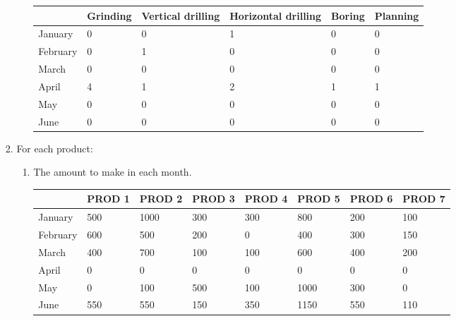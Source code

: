 \documentclass[12pt,a4paper]{article}
\theoremstyle{definition}
\begin{document}
\begin{enumerate}
\begin{enumerate}
\begin{enumerate}
\begin{enumerate}
    \begin{table}[H]
      \scriptsize
      \centering
      \renewcommand\arraystretch{1.1}
      \begin{tabular}{m{} m{}<{\centering} m{}<{\centering} m{}<{\centering} m{}<{\centering} m{}<{\centering} }
      \hline
       & \textbf{Grinding} & \textbf{Vertical drilling} & \textbf{Horizontal drilling} & \textbf{Boring} & \textbf{Planning} \\\hline
      January   & 0 & 0 & 1 & 0 & 0  \\
      February  & 0 & 1 & 0 & 0 & 0  \\
      March     & 0 & 0 & 0 & 0 & 0 \\
      April     & 4 & 1 & 2 & 1 & 1  \\
      May       & 0 & 0 & 0 & 0 & 0\\
      June      & 0 & 0 & 0 & 0 & 0 \\
      \hline
      \end{tabular}
    \end{table}
    \end{enumerate}
    \item
    For each product:
    \begin{enumerate}
    \item
    The amount to make in each month.
    \begin{table}[H]
      \scriptsize
      \centering
      \renewcommand\arraystretch{1.1}
      \begin{tabular}{m{} m{}<{\centering} m{}<{\centering} m{}<{\centering} m{}<{\centering} m{}<{\centering} m{}<{\centering} m{}<{\centering}}
      \hline
       & \textbf{PROD 1} & \textbf{PROD 2} & \textbf{PROD 3} & \textbf{PROD 4} & \textbf{PROD 5} & \textbf{PROD 6} &  \textbf{PROD 7} \\\hline
      January   & 500 & 1000 & 300 & 300 & 800 & 200 & 100 \\
      February  & 600 & 500 & 200   & 0 & 400 & 300 & 150 \\
      March     & 400 & 700 & 100 & 100 & 600 & 400 & 200 \\
      April     & 0   & 0   & 0   & 0   & 0   & 0   & 0 \\
      May       & 0   & 100 & 500 & 100 & 1000 & 300 & 0 \\
      June      & 550 & 550 & 150 & 350 & 1150 & 550 & 110 \\

\end{tabular}
\end{table}
\end{enumerate}
\end{enumerate}
\end{enumerate}
\end{enumerate}
\end{document}
